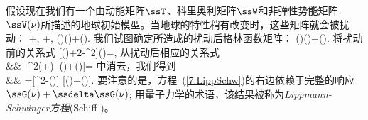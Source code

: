 假设现在我们有一个由动能矩阵$\ssT$、科里奥利矩阵$\ssW$和非弹性势能矩阵$\ssV(\nu)$所描述的地球初始模型。当地球的特性稍有改变时，这些矩阵就会被扰动：
\eq
\ssT\rightarrow\ssT+\ssdelta\ssT,\qquad
\ssW\rightarrow\ssW+\ssdelta\ssW,\qquad
\ssV(\nu)\rightarrow\ssV(\nu)+\ssdelta\ssV(\nu).
\en
我们试图确定所造成的扰动后格林函数矩阵：
\eq
\ssG(\nu)\rightarrow\ssG(\nu)+\ssdelta\ssG(\nu).
\en
将扰动前的关系式
\eq
\label{7.Greeneqn1}
[\ssV(\nu)+2\nu\ssW-\nu^2\ssT]\ssG(\nu)=\ssI,
\en
从扰动后相应的关系式
\eqa
\label{7.Greeneqn2}
\lefteqn{
[\ssV(\nu)+\ssdelta\ssV(\nu)+2\nu(\ssW+\ssdelta\ssW)} \nonumber \\
&&\mbox{}\qquad\qquad
-\nu^2(\ssT+\ssdelta\ssT)][\ssG(\nu)+\ssdelta\ssG(\nu)]=\ssI
\ena
中消去，我们得到
\eqa
\label{7.LippSchw}
\lefteqn{
[\ssV(\nu)+2\nu\ssW-\nu^2\ssT]\ssdelta\ssG(\nu)} \nonumber \\
&&\mbox{}\qquad\qquad
=[\nu^2\ssdelta{}\nu\hspace{0.3 mm}\ssdelta\ssW-\ssdelta\ssV(\nu)]
[\ssG(\nu)+\ssdelta\ssG(\nu)].
\ena
要注意的是，方程~(\ref{7.LippSchw})的右边依赖于完整的响应$\ssG(\nu)+\ssdelta\ssG(\nu)$;
用量子力学的术语，该结果被称为{\em Lippmann-Schwinger方程\/}(Schiff \citeyear{schiff68})。
%

